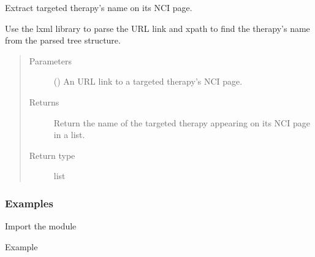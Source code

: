 \documentclass[letterpaper,10pt,english]{sphinxmanual}
\begin{document}
\begin{fulllineitems}
\label{\detokenize{biomarker_extraction:biomarker_extraction.targeted_therapy_name}}
\sphinxAtStartPar
Extract targeted therapy’s name on its NCI page.

\sphinxAtStartPar
Use the lxml library to parse the URL link and xpath to find the therapy’s name from the parsed tree structure.
\begin{quote}\begin{description}
\item[{Parameters}] \leavevmode
\sphinxAtStartPar
{} () \textendash{} An URL link to a targeted therapy’s NCI page.

\item[{Returns}] \leavevmode
\sphinxAtStartPar
Return the name of the targeted therapy appearing on its NCI page in a list.

\item[{Return type}] \leavevmode
\sphinxAtStartPar
list

\end{description}\end{quote}
\subsubsection*{Examples}

\sphinxAtStartPar
Import the module

\begin{sphinxVerbatim}[commandchars=\\\{\}]
   
\end{sphinxVerbatim}

\sphinxAtStartPar
Example

\begin{sphinxVerbatim}[commandchars=\\\{\}]
  
  
\end{sphinxVerbatim}

\end{fulllineitems}
\end{document}
